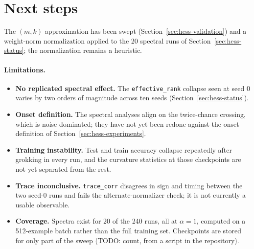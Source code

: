 \documentclass[11pt,a4paper]{article}
\begin{document}
\section{Next steps}
\label{sec:hess-next}

The $(m,k)$ approximation has been swept (Section~\ref{sec:hess-validation}) and a
weight-norm normalization applied to the 20 spectral runs of
Section~\ref{sec:hess-status}; the normalization remains a heuristic.

\paragraph{Limitations.}
\begin{itemize}[leftmargin=*,itemsep=2pt]
    \item \textbf{No replicated spectral effect.} The \texttt{effective\_rank}
    collapse seen at seed 0 varies by two orders of magnitude across ten seeds
    (Section~\ref{sec:hess-status}).
    \item \textbf{Onset definition.} The spectral analyses align on the
    twice-chance crossing, which is noise-dominated; they have not yet been
    redone against the onset definition of Section~\ref{sec:hess-experiments}.
    \item \textbf{Training instability.} Test and train accuracy collapse
    repeatedly after grokking in every run, and the curvature statistics at
    those checkpoints are not yet separated from the rest.
    \item \textbf{Trace inconclusive.} \texttt{trace\_corr} disagrees in sign
    and timing between the two seed-0 runs and fails the alternate-normalizer
    check; it is not currently a usable observable.
    \item \textbf{Coverage.} Spectra exist for 20 of the 240 runs, all at
    $\alpha=1$, computed on a 512-example batch rather than the full training
    set. Checkpoints are stored for only part of the sweep (TODO: count, from a
    script in the repository).
\end{itemize}
\end{document}
